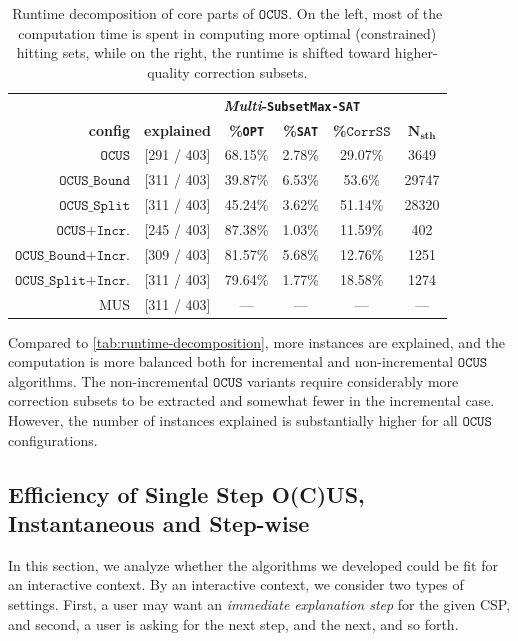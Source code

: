 \documentclass[twoside,11pt]{article}
\newcommand\mm[1]{\ensuremath{#1}\xspace}
\newcommand\call[1]{\mm{\texttt{#1}}}
\newcommand\sat{\texttt{{SAT}}\xspace}
\newcommand\subsetmaxsat{\texttt{SubsetMax-SAT}}
\newcommand\comus{\mm{\call{OCUS}}}
\newcommand{\comusbound}{\mm{\call{OCUS\_Bound}}}
\newcommand\comusincr{\mm{\call{OCUS+Incr.}}}
\newcommand\ousbiter{\mm{\call{OCUS\_Split}}}
\newcommand\ousbincr{\mm{\call{OCUS\_Bound+Incr.}}}
\newcommand\ousbiterincr{\mm{\call{OCUS\_Split+Incr.}}}
\newcommand\corrss{\mm{\call{CorrSS}}}
\begin{document}
\begin{table}[!h]
	\centering
	\begin{tabular}{r|c|c|c|c|c}
		&  \multicolumn{5}{c}{\textbf{\emph{Multi}-\subsetmaxsat}}\\[1ex]
		\textbf{config}          & \textbf{explained}  &  \textbf{\%\texttt{OPT}} &   \textbf{\%\sat} & \textbf{\%\corrss} &  $\mathbf{N_{sth}}$   \\ \midrule 
		\comus                  & [291 / 403] & 68.15\% & 2.78\%  &    29.07\% &      3649 \\
		\comusbound             & [311 / 403] & 39.87\% & 6.53\%  &     53.6\% &     29747 \\
		\ousbiter               & [311 / 403] & 45.24\% & 3.62\%  &    51.14\% &     28320 \\ \hline
		\comusincr              & [245 / 403] & 87.38\% & 1.03\%  &    11.59\% &       402 \\
		\ousbincr  		        & [309 / 403] & 81.57\% & 5.68\%  &    12.76\% &      1251 \\
		\ousbiterincr           & [311 / 403] & 79.64\% & 1.77\%  &    18.58\% &      1274 \\ \hline
		MUS                     & [311 / 403] &    --- &       ---&          ---&      --- \\
	\end{tabular}
	\caption{Runtime decomposition of core parts of \call{OCUS}. On the left, most of the computation time is spent in computing more optimal (constrained) hitting sets, while on the right, the runtime is shifted toward higher-quality correction subsets.}
	\label{tab:runtime-decomposition-corr-susbet-enum}
\end{table}

Compared to \cref{tab:runtime-decomposition}, more instances are explained, and the computation is more balanced both for incremental and non-incremental \comus algorithms.
The non-incremental \comus variants require considerably more correction subsets to be extracted and somewhat fewer in the incremental case. 
However, the number of instances explained is substantially higher for all \comus configurations.

\subsection{Efficiency of Single Step O(C)US, Instantaneous and Step-wise}

In this section, we analyze whether the algorithms we developed could be fit for an interactive context. By an interactive context, we consider two types of settings. First, a user may want an \emph{immediate explanation step} for the given CSP, and second, a user is asking for the next step, and the next, and so forth. 
\end{document}
